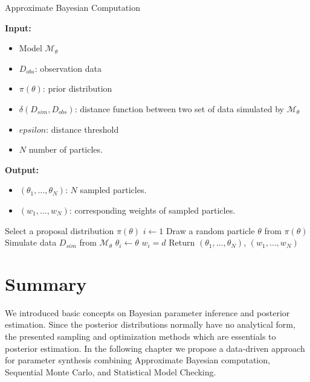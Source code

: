 \begin{algorithm}[H]
    \caption{Approximate Bayesian Computation}
    \label{alg:abc-reject}
    \footnotesize{
        \hspace*{\algorithmicindent} \textbf{Input:}
        \begin{itemize}[noitemsep,topsep=0pt]
            \item Model $\mathcal{M}_\theta$
            \item $D_{obs}$: observation data
            \item $\pi(\theta)$: prior distribution
            \item $\delta(D_{sim}, D_{obs})$: distance function between two set of data simulated by $\mathcal{M}_\theta$
            \item $epsilon$: distance threshold
            \item $N$ number of particles.
        \end{itemize}
        \hspace*{\algorithmicindent} \textbf{Output:}
        \begin{itemize}[noitemsep,topsep=0pt]
            \item $(\theta_1,\ldots,\theta_N)$: $N$ sampled particles.
            \item $(w_1,\ldots,w_N)$: corresponding weights of sampled particles.
        \end{itemize}
    }
    \begin{algorithmic}[1]
        \State Select a proposal distribution $\pi(\theta)$
        \State $i \leftarrow 1$
        \State Draw a random particle $\theta$ from $\pi(\theta)$
        \State Simulate data $D_{sim}$ from $\mathcal{M}_\theta$
        \State $\theta_i \leftarrow \theta$
        \State $w_i = d$
        \EndIf
        \EndWhile
        \State Return $(\theta_1,\ldots,\theta_N)$, $(w_1,\ldots,w_N)$
        \EndProcedure
    \end{algorithmic}
\end{algorithm}


\section{Summary}
We introduced basic concepts on Bayesian parameter inference and posterior estimation. Since the
posterior distributions normally have no analytical form, the presented sampling and
optimization methods which are essentials to posterior estimation. In the following chapter we
propose a data-driven approach for parameter synthesis combining Approximate Bayesian computation,
Sequential Monte Carlo, and Statistical Model Checking.
